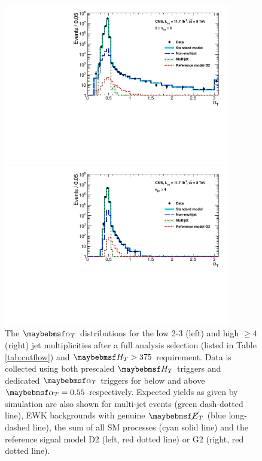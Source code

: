 \begin{figure}[ht]
\centering
\begin{minipage}[b]{0.48 \linewidth}
\includegraphics[width = 1.0\linewidth,height = 7.0cm]{plots/alphat_low.pdf}
\end{minipage}
\quad
\begin{minipage}[b]{0.48\linewidth}
\includegraphics[width = 1.0\linewidth, height = 7.0cm]{plots/alphat_high.pdf}
\end{minipage}
\caption[ The $\alphat$ distributions for the low 2-3 (left) and high $\geq 4$ (right) jet multiplicities after a full analysis selection and $\theht > 375$ requirement.]{The $\alphat$ distributions for the low 2-3 (left) and high $\geq 4$ (right) jet multiplicities after a full analysis selection (listed in Table \ref{tab:cutflow}) and $\theht > 375$ requirement. Data is collected using both prescaled $\theht$ triggers and dedicated $\alphat$ triggers for below and above $\alphat = 0.55$ respectively. Expected yields as given by simulation are also shown for multi-jet events (green dash-dotted line), \ac{EWK} backgrounds with genuine $\met$ (blue long-dashed line), the sum of all \ac{SM} processes (cyan solid line) and the reference signal model D2 (left, red dotted line) or G2 (right, red dotted line). }
\label{fig:fullalphatdistribution}
\end{figure}

